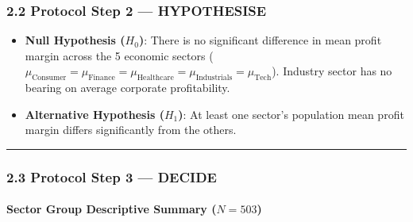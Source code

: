 \documentclass[
]{article}
\providecommand{\tightlist}{%
  \setlength{\itemsep}{0pt}\setlength{\parskip}{0pt}}
\begin{document}
\subsubsection{2.2 Protocol Step 2 ---
HYPOTHESISE}\label{protocol-step-2-hypothesise}

\begin{itemize}
\tightlist
\item
  \textbf{Null Hypothesis (\(H_0\))}: There is no significant difference
  in mean profit margin across the 5 economic sectors
  (\(\mu_{\text{Consumer}} = \mu_{\text{Finance}} = \mu_{\text{Healthcare}} = \mu_{\text{Industrials}} = \mu_{\text{Tech}}\)).
  Industry sector has no bearing on average corporate profitability.
\item
  \textbf{Alternative Hypothesis (\(H_1\))}: At least one sector's
  population mean profit margin differs significantly from the others.
\end{itemize}

\begin{center}\rule{0.5\linewidth}{0.5pt}\end{center}

\subsubsection{2.3 Protocol Step 3 ---
DECIDE}\label{protocol-step-3-decide}

\paragraph{\texorpdfstring{Sector Group Descriptive Summary
(\(N = 503\))}{Sector Group Descriptive Summary (N = 503)}}\label{sector-group-descriptive-summary-n-503}
\end{document}
